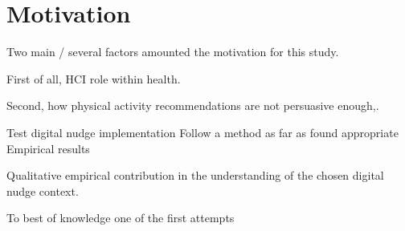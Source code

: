 \chapter*{Motivation} 

Two main / several factors amounted the motivation for this study. 

First of all, HCI role within health. 

Second, how physical activity recommendations are not persuasive enough,. 

Test digital nudge implementation
Follow a method as far as found appropriate 
Empirical results 

Qualitative empirical contribution in the understanding of the chosen digital nudge context. 

To best of knowledge one of the first attempts 
